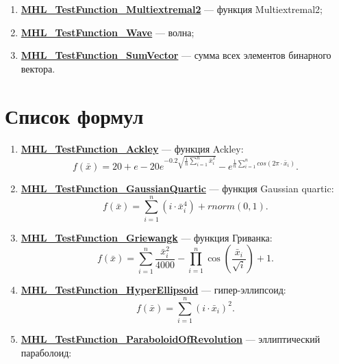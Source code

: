 \begin{enumerate}
 \item \hyperref[TestFunctions:section:MHL_TestFunction_Multiextremal2]{\textbf{MHL\_TestFunction\_Multiextremal2}} --- функция Multiextremal2;
 \item \hyperref[TestFunctions:section:MHL_TestFunction_Wave]{\textbf{MHL\_TestFunction\_Wave}} --- волна;
 \item \hyperref[TestFunctions:section:MHL_TestFunction_SumVector]{\textbf{MHL\_TestFunction\_SumVector}} --- сумма всех элементов бинарного вектора.
\end{enumerate}

\section {Список формул}

\begin{enumerate}
 \item \hyperref[TestFunctions:section:MHL_TestFunction_Ackley]{\textbf{MHL\_TestFunction\_Ackley}} --- функция Ackley:
 \begin{equation}
 f\left( \bar{x}\right) = 20 + e - 20e^{-0.2\sqrt{\frac{1}{n}\sum_{i=1}^{n}\bar{x}_i^2}}-e^{\frac{1}{n}\sum_{i=1}^{n}cos\left( 2\pi\cdot\bar{x}_i\right) }.
 \end{equation}
 \item \hyperref[TestFunctions:section:MHL_TestFunction_GaussianQuartic]{\textbf{MHL\_TestFunction\_GaussianQuartic}} --- функция Gaussian quartic:
 \begin{equation}
 f\left( \bar{x}\right) = \sum_{i=1}^{n}\left( i\cdot\bar{x}_i^4\right) +rnorm\left( 0,1\right).
 \end{equation}
 \item \hyperref[TestFunctions:section:MHL_TestFunction_Griewangk]{\textbf{MHL\_TestFunction\_Griewangk}} --- функция Гриванка:
\begin{equation}
f\left( \bar{x}\right) = \sum_{i=1}^{n}\dfrac{\bar{x}_i^2}{4000}-\prod_{i=1}^{n}\cos\left( \dfrac{\bar{x}_i}{\sqrt{i}}\right)+1.
\end{equation} \item \hyperref[TestFunctions:section:MHL_TestFunction_HyperEllipsoid]{\textbf{MHL\_TestFunction\_HyperEllipsoid}} --- гипер-эллипсоид:
\begin{equation}
f\left( \bar{x}\right) = \sum_{i=1}^{n}\left( i\cdot\bar{x}_i\right) ^2.
\end{equation}
 \item \hyperref[TestFunctions:section:MHL_TestFunction_ParaboloidOfRevolution]{\textbf{MHL\_TestFunction\_ParaboloidOfRevolution}} --- эллиптический параболоид:

\end{enumerate}
